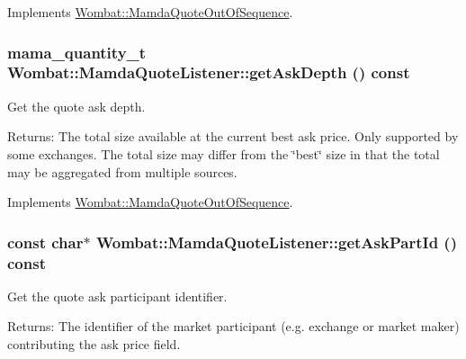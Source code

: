 Implements \hyperlink{classWombat_1_1MamdaQuoteOutOfSequence_4ce63ffd5bba87b803bb07ebceb53dc1}{Wombat::Mamda\-Quote\-Out\-Of\-Sequence}.\hypertarget{classWombat_1_1MamdaQuoteListener_4bc38582299115bc9d45411e4fabc76d}{
\subsubsection[getAskDepth]{\setlength{\rightskip}{0pt plus 5cm}mama\_\-quantity\_\-t Wombat::Mamda\-Quote\-Listener::get\-Ask\-Depth () const}}
\label{classWombat_1_1MamdaQuoteListener_4bc38582299115bc9d45411e4fabc76d}


Get the quote ask depth. 

\begin{Desc}
\item[Returns:]The total size available at the current best ask price. Only supported by some exchanges. The total size may differ from the \char`\"{}best\char`\"{} size in that the total may be aggregated from multiple sources. \end{Desc}


Implements \hyperlink{classWombat_1_1MamdaQuoteOutOfSequence_c225d8c6500428e7ab5c34c1a403a230}{Wombat::Mamda\-Quote\-Out\-Of\-Sequence}.\hypertarget{classWombat_1_1MamdaQuoteListener_b8a1c5463eb9ebf89fc402c32e2c81c7}{
\subsubsection[getAskPartId]{\setlength{\rightskip}{0pt plus 5cm}const char$\ast$ Wombat::Mamda\-Quote\-Listener::get\-Ask\-Part\-Id () const}}
\label{classWombat_1_1MamdaQuoteListener_b8a1c5463eb9ebf89fc402c32e2c81c7}


Get the quote ask participant identifier. 

\begin{Desc}
\item[Returns:]The identifier of the market participant (e.g. exchange or market maker) contributing the ask price field. \end{Desc}


